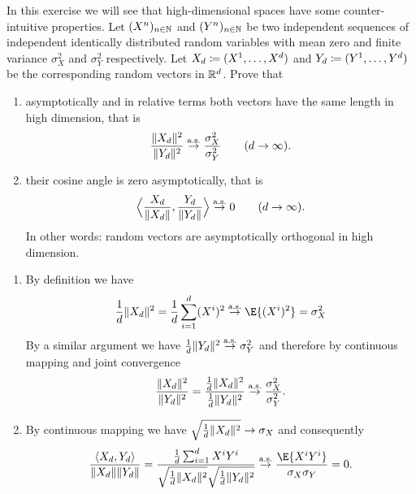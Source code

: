 \documentclass[11pt]{article}
\begin{document}
\begin{exercise}[subtitle={Random vectors in high dimension}]
    In this exercise we will see that high-dimensional spaces have some counter-intuitive
    properties. Let \((X^n)_{n\in \nat}\) and \((Y^n)_{n\in \nat}\) be two independent
    sequences of independent identically distributed random variables with mean
    zero and finite variance \(\sigma_X^2\) and \(\sigma_Y^2\) respectively. Let \(X_\dims \coloneq (X^1, \ldots, X^\dims)\)
    and \(Y_\dims \coloneq (Y^1, \ldots, Y^\dims)\) be the corresponding random vectors in
    \(\real^\dims\).
    Prove that
    \begin{enumerate}[label=(\alph*), noitemsep]
        \item\label{it: (random vectors in high dim) norms}
        asymptotically and in relative terms both vectors have the same
        length in high dimension, that is
        \[
            \frac{\norm{X_\dims}^2}{\norm{Y_\dims}^2} \overset\as\to \frac{\sigma_X^2}{\sigma_Y^2} \qquad (\dims \to \infty).
        \]
        \item\label{it: (random vectors in high dim) angle} their cosine angle is zero asymptotically, that is
        \[
            \scp[\Big]{\frac{X_\dims}{\norm{X_\dims}}, \frac{Y_\dims}{\norm{Y_\dims}}} \overset\as\to 0 \qquad (\dims \to \infty).
        \]
        In other words: random vectors are asymptotically orthogonal in high dimension.
    \end{enumerate}
\end{exercise}

\begin{solution}
\begin{enumerate}[wide=0pt]
    \item[\ref{it: (random vectors in high dim) norms}]
    By definition we have
    \[
        \frac1\dims\norm{X_\dims}^2
        = \frac1\dims \sum_{i=1}^\dims (X^i)^2
        \overset{\as}\to \E{(X^i)^2}
        = \sigma_X^2
    \]
    By a similar argument we have \(\frac1\dims\norm{Y_\dims}^2\overset{\as}\to \sigma_Y^2\)
    and therefore by continuous mapping and joint convergence
    \[
        \frac{\norm{X_\dims}^2}{\norm{Y_\dims}^2}
        = \frac{\frac1\dims\norm{X_\dims}^2}{\frac1\dims\norm{Y_\dims}^2}
        \overset{\as}\to \frac{\sigma_X^2}{\sigma_Y^2}.
    \]
    \item[\ref{it: (random vectors in high dim) angle}]
    By continuous mapping we have \(\sqrt{\frac1\dims \norm{X_\dims}^2} \to \sigma_X\)
    and consequently
    \[
        \frac{\scp{X_\dims, Y_\dims}}{\norm{X_\dims} \norm{Y_\dims}}
        = \frac{\frac1\dims \sum_{i=1}^\dims X^i Y^i}{\sqrt{\frac1\dims \norm{X_\dims}^2} \sqrt{\frac1\dims \norm{Y_\dims}^2}}
        \overset{\as}\to \frac{\E{X^i Y^i}}{\sigma_X\sigma_Y}
        = 0.
    \]
\end{enumerate}
\end{solution}
\end{document}
